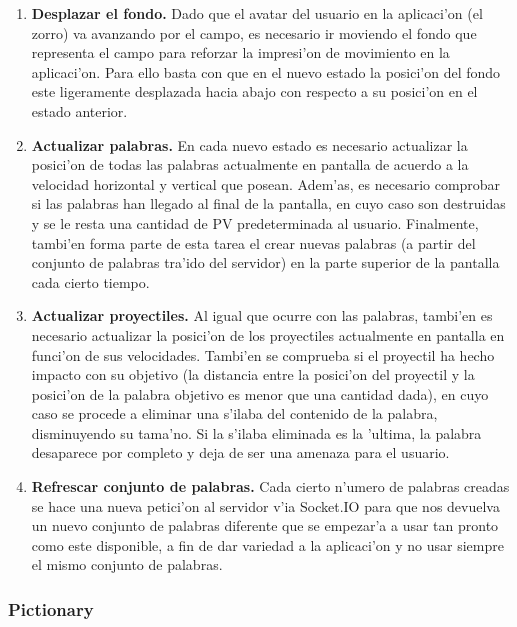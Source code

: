 \begin{itemize}
\begin{enumerate}
\item \textbf{Desplazar el fondo.} Dado que el avatar del usuario en la aplicaci'on (el zorro) va avanzando por el campo, es
necesario ir moviendo el fondo que representa el campo para reforzar la impresi'on de movimiento en la aplicaci'on.
Para ello basta con que en el nuevo estado la posici'on del fondo este ligeramente desplazada hacia abajo con
respecto a su posici'on en el estado anterior.
\item \textbf{Actualizar palabras.} En cada nuevo estado es necesario actualizar la posici'on de todas las palabras
actualmente en pantalla de acuerdo a la velocidad horizontal y vertical que posean.
Adem'as, es necesario comprobar si las palabras han llegado al final de la pantalla, en cuyo caso son destruidas y
se le resta una cantidad de PV predeterminada al usuario.
Finalmente, tambi'en forma parte de esta tarea el crear nuevas palabras (a partir del conjunto de palabras tra'ido
del servidor) en la parte superior de la pantalla cada cierto tiempo.
\item \textbf{Actualizar proyectiles.} Al igual que ocurre con las palabras, tambi'en es necesario actualizar la posici'on de
los proyectiles actualmente en pantalla en funci'on de sus velocidades.
Tambi'en se comprueba si el proyectil ha hecho impacto con su objetivo (la distancia entre la posici'on del proyectil
y la posici'on de la palabra objetivo es menor que una cantidad dada), en cuyo caso se procede a eliminar una s'ilaba
del contenido de la palabra, disminuyendo su tama'no. Si la s'ilaba eliminada es la 'ultima, la palabra desaparece
por completo y deja de ser una amenaza para el usuario.
\item \textbf{Refrescar conjunto de palabras.} Cada cierto n'umero de palabras creadas se hace una nueva petici'on al servidor
v'ia Socket.IO para que nos devuelva un nuevo conjunto de palabras diferente que se empezar'a a usar tan pronto como
este disponible, a fin de dar variedad a la aplicaci'on y no usar siempre el mismo conjunto de palabras.
\end{enumerate}
\end{itemize}

\subsubsection{Pictionary}
\label{sub:pictionary}

